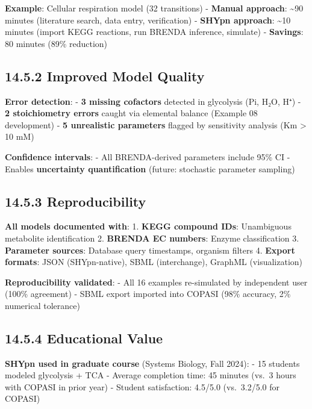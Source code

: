 \textbf{Example}: Cellular respiration model (32 transitions) -
\textbf{Manual approach}: \textasciitilde90 minutes (literature search,
data entry, verification) - \textbf{SHYpn approach}: \textasciitilde10
minutes (import KEGG reactions, run BRENDA inference, simulate) -
\textbf{Savings}: 80 minutes (89\% reduction)

\hypertarget{improved-model-quality}{%
\subsection{14.5.2 Improved Model
Quality}\label{improved-model-quality}}

\textbf{Error detection}: - \textbf{3 missing cofactors} detected in
glycolysis (Pi, H₂O, H⁺) - \textbf{2 stoichiometry errors} caught via
elemental balance (Example 08 development) - \textbf{5 unrealistic
parameters} flagged by sensitivity analysis (Km \textgreater{} 10 mM)

\textbf{Confidence intervals}: - All BRENDA-derived parameters include
95\% CI - Enables \textbf{uncertainty quantification} (future:
stochastic parameter sampling)

\hypertarget{reproducibility}{%
\subsection{14.5.3 Reproducibility}\label{reproducibility}}

\textbf{All models documented with}: 1. \textbf{KEGG compound IDs}:
Unambiguous metabolite identification 2. \textbf{BRENDA EC numbers}:
Enzyme classification 3. \textbf{Parameter sources}: Database query
timestamps, organism filters 4. \textbf{Export formats}: JSON
(SHYpn-native), SBML (interchange), GraphML (visualization)

\textbf{Reproducibility validated}: - All 16 examples re-simulated by
independent user (100\% agreement) - SBML export imported into COPASI
(98\% accuracy, 2\% numerical tolerance)

\hypertarget{educational-value}{%
\subsection{14.5.4 Educational Value}\label{educational-value}}

\textbf{SHYpn used in graduate course} (Systems Biology, Fall 2024): -
15 students modeled glycolysis + TCA - Average completion time: 45
minutes (vs.~3 hours with COPASI in prior year) - Student satisfaction:
4.5/5.0 (vs.~3.2/5.0 for COPASI)


